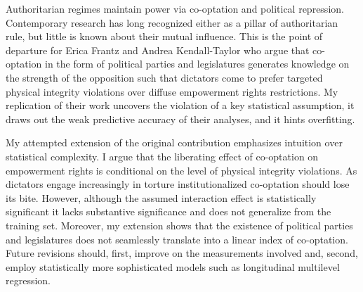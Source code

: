 Authoritarian regimes maintain power via co-optation and 
political repression. Contemporary research has long 
recognized either as a pillar of authoritarian rule, but 
little is known about their mutual influence. This is the 
point of departure for Erica Frantz and Andrea 
Kendall-Taylor who argue that co-optation in the form of 
political parties and legislatures generates knowledge on 
the strength of the opposition such that dictators come to 
prefer targeted physical integrity violations over diffuse 
empowerment rights restrictions. My replication of their 
work uncovers the violation of a key statistical assumption,
it draws out the weak predictive accuracy of their analyses,
and it hints overfitting. 

My attempted extension of the original contribution 
emphasizes intuition over statistical complexity. I argue 
that the liberating effect of co-optation on empowerment 
rights is conditional on the level of physical integrity
violations. As dictators engage increasingly in torture 
institutionalized co-optation should lose its bite. However,
although the assumed interaction effect is statistically 
significant it lacks substantive significance and does not 
generalize from the training set. Moreover, my extension 
shows that the existence of political parties and 
legislatures does not seamlessly translate into a linear 
index of co-optation. Future revisions should, first, 
improve on the measurements involved and, second, employ 
statistically more sophisticated models such as longitudinal
multilevel regression.
